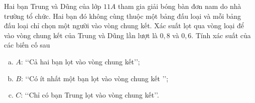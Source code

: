 \begin{bt}%
	Hai bạn Trung và Dũng của lớp $11A$ tham gia giải bóng bàn đơn nam do nhà trường tổ chức. Hai bạn đó không cùng thuộc một bảng đấu loại và mỗi bảng đấu loại chỉ chọn một người vào vòng chung kết. Xác suất lọt qua vòng loại để vào vòng chung kết của Trung và Dũng lần lượt là $0{,}8$ và $0{,}6$. Tính xác suất của các biến cố sau
	\begin{enumerate}[a)]
		\item $A$: \lq\lq Cả hai bạn lọt vào vòng chung kết\rq\rq;
		\item $B$: \lq\lq Có ít nhất một bạn lọt vào vòng chung kết \rq\rq;
		\item $C$: \lq\lq Chỉ có bạn Trung lọt vào vòng chung kết\rq\rq.		
	\end{enumerate}
	
\end{bt}

